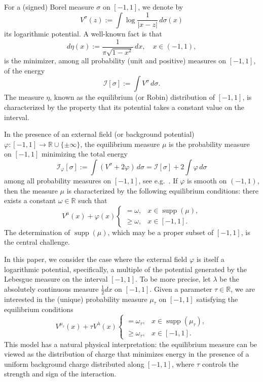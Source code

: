 \documentclass[reqno,11pt]{amsart}
\theoremstyle{plain}
\theoremstyle{definition}
\theoremstyle{remark}
\numberwithin{equation}{section}
\DeclareMathOperator{\supp}{supp}
\newcommand{\R}{\mathbb{R}}
\begin{document}
For a (signed) Borel measure $\sigma$ on $[-1,1]$, we denote by 
\begin{equation*}\label{Def_Log_Potential}
    V^\sigma(z):=\int\log\frac{1}{|x-z|}\, d\sigma(x)
\end{equation*}
its logarithmic potential. A well-known fact is that 
$$
d\eta(x):=\frac{1}{\pi \sqrt{1-x^2}}\, dx, \quad x\in (-1,1),
$$
is the minimizer, among all probability (unit and positive) measures on $[-1,1]$, of the energy
$$
\mathcal I[\sigma]:= \int V^\sigma \, d\sigma .
$$
The measure $\eta$, known as the equilibrium (or Robin) distribution of $[-1,1]$, is characterized by the property that its potential takes a constant value on the interval.

In the presence of an external field (or background potential) $\varphi:[-1,1]\to \R\cup \{\pm \infty\}$, the equilibrium measure $\mu$ is the probability measure on $[-1,1]$ minimizing the total energy
$$
\mathcal I_\varphi[\sigma]:= \int \left( V^\sigma +2\varphi  \right)\, d\sigma =\mathcal I[\sigma]+ 2 \int \varphi\, d\sigma
$$
among all probability  measures on $[-1,1]$, see e.g.~\cite{Saff:97}. If $\varphi$ is smooth on $(-1,1)$, then the measure $\mu$ is characterized by the following equilibrium conditions: there exists a constant $\omega\in \R$ such that
\begin{equation*}
   V^\mu(x)  +\varphi(x) \begin{cases}
       = \omega, & x\in \supp (\mu), \\
    \ge \omega, & x\in [-1,1].
   \end{cases}
\end{equation*}
The determination of $\supp (\mu)$, which may be a proper subset of  $[-1,1]$, is the central challenge.

In this paper, we consider the case where the external field $\varphi$ is itself a logarithmic potential, specifically, a multiple of the potential generated by the Lebesgue measure on the interval $[-1,1]$. To be more precise, let $\lambda$ be the absolutely continuous measure $\frac{1}{2}dx$ on $[-1,1]$. Given a parameter $\tau\in \R$, we are interested in the (unique) probability measure $\mu_\tau$ on $[-1,1]$ satisfying the equilibrium conditions
\begin{equation}
    \label{equilibrium}
   V^{\mu_\tau}(x)  +\tau V^{\lambda}(x) \begin{cases}
       = \omega_\tau, & x\in \supp (\mu_\tau), \\
    \ge \omega_\tau, & x\in [-1,1].
   \end{cases}
\end{equation}
This model has a natural physical interpretation: the equilibrium measure can be viewed as the distribution of charge that minimizes energy in the presence of a uniform background charge distributed along $[-1,1]$, where $\tau$ controls the strength and sign of the interaction.
\end{document}
